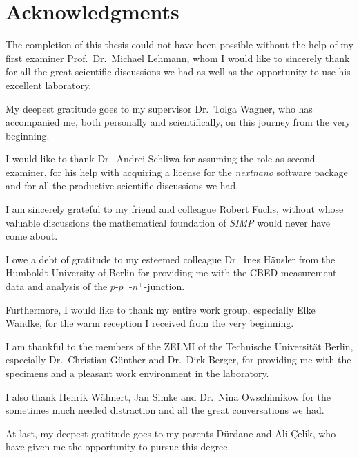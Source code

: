 \chapter*{Acknowledgments}
The completion of this thesis could not have been possible without the help of my first examiner Prof.~Dr.~Michael Lehmann, whom I would like to sincerely thank for all the great scientific discussions we had as well as the opportunity to use his excellent laboratory.

My deepest gratitude goes to my supervisor Dr.~Tolga Wagner, who has accompanied me, both personally and scientifically, on this journey from the very beginning.

I would like to thank Dr.~Andrei Schliwa for assuming the role as second examiner, for his help with acquiring a license for the \emph{nextnano} software package and for all the productive scientific discussions we had.

I am sincerely grateful to my friend and colleague Robert Fuchs, without whose valuable discussions the mathematical foundation of \emph{SIMP} would never have come about.

I owe a debt of gratitude to my esteemed colleague Dr.~Ines Häusler from the Humboldt University of Berlin for providing me with the CBED measurement data and analysis of the $p$-$p^+$-$n^+$-junction.

Furthermore, I would like to thank my entire work group, especially Elke Wandke, for the warm reception I received from the very beginning.

I am thankful to the members of the ZELMI of the Technische Universität Berlin, especially Dr.~Christian Günther and Dr.~Dirk Berger, for providing me with the specimens and a pleasant work environment in the laboratory.

I also thank Henrik Wähnert, Jan Simke and Dr.~Nina Owschimikow for the sometimes much needed distraction and all the great conversations we had.

At last, my deepest gratitude goes to my parents Dürdane and Ali Çelik, who have given me the opportunity to pursue this degree.
